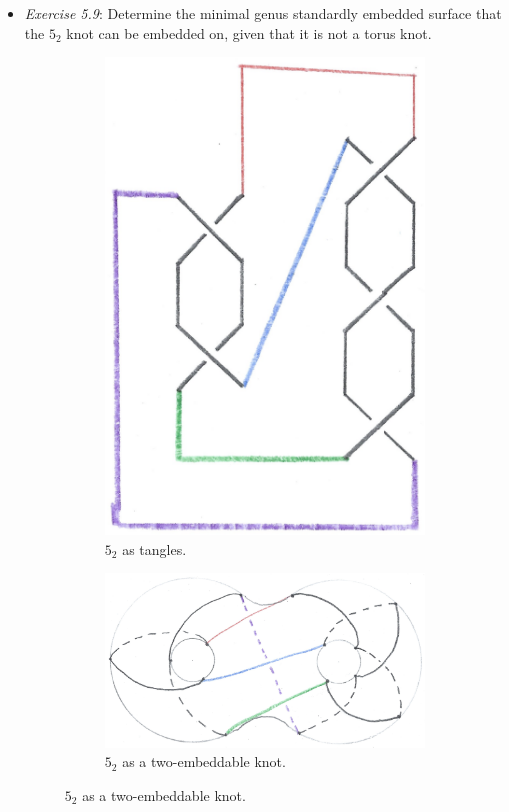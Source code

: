 \documentclass[titlepage]{article}
\numberwithin{figure}{section}
\numberwithin{table}{section}
\numberwithin{equation}{section}
\begin{document}
\begin{itemize}
    \item \emph{Exercise 5.9}: Determine the minimal genus standardly embedded surface that the $5_2$ knot can be embedded on, given that it is not a torus knot.
    \begin{figure}[h!]
        \centering
        \begin{subfigure}[b]{0.3\linewidth}
            \centering
            \includegraphics[width=0.65\linewidth]{Blender/ex5-9a.png}
            \caption{$5_2$ as tangles.}
            \label{fig:32knota}
        \end{subfigure}
        \begin{subfigure}[b]{0.6\linewidth}
            \centering
            \includegraphics[width=0.9\linewidth]{Blender/ex5-9b.png}
            \caption{$5_2$ as a two-embeddable knot.}

\end{subfigure}
\end{figure}
\end{itemize}
\end{document}
